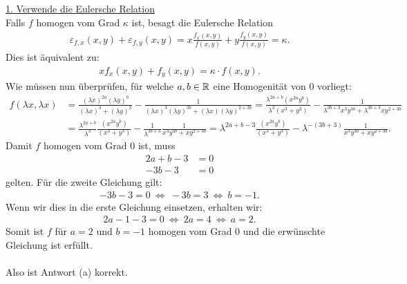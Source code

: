 \underline{1. Verwende die Eulersche Relation}\\
Falls $ f $ homogen vom Grad $ \kappa $ ist, besagt die Eulersche Relation
\begin{align*}
	\varepsilon_{f,x}(x,y) + \varepsilon_{f,y}(x,y) 
	= x \frac{f_x(x,y)}{f(x,y)} + y \frac{f_y(x,y)}{f(x,y)}
	= \kappa.
\end{align*}
Dies ist äquivalent zu:
\begin{align*}
	x f_x(x,y) + f_y(x,y) = \kappa \cdot f(x,y).
\end{align*}
Wie müssen nun überprüfen, für welche $ a, b\in \mathbb{R} $ eine Homogenität von $ 0 $ vorliegt:
\begin{align*}
	f(\lambda x, \lambda x)
	&=
	\frac{(\lambda x)^{2a} (\lambda y)^b}{(\lambda x)^3 +(\lambda y)^3}
	- 
	\frac{1}{(\lambda x)^3 (\lambda y)^{3b} + (\lambda x) (\lambda y)^{2 + 3b}}
	=
	\frac{\lambda^{2a +b} ( x^{2a}  y^b)}{\lambda^3 (x^3 + y^3 )}
	- 
	\frac{1}{\lambda^{3b + 3} x^3  y^{3b} + \lambda^{3b + 3} x  y^{2 + 3b}}\\
	&=
	\frac{\lambda^{2a +b}}{\lambda^3}\frac{ ( x^{2a}  y^b)}{ (x^3 + y^3 )}
	- 
	\frac{1}{\lambda^{3b + 3}}\frac{1}{ x^3  y^{3b} +  x  y^{2 + 3b}}
	=
		\lambda^{2a +b - 3}\frac{ ( x^{2a}  y^b)}{ (x^3 + y^3 )}
	- 
	\lambda^{-(3b + 3)}\frac{1}{ x^3  y^{3b} +  x  y^{2 + 3b}}.
\end{align*}
Damit $ f $ homogen vom Grad $ 0 $ ist, muss 
\begin{align*}
	2a + b - 3 &= 0\\
	-3b - 3 &= 0
\end{align*}
gelten. Für die zweite Gleichung gilt:
\begin{align*}
	-3b - 3 = 0 
	\ \Leftrightarrow \
	-3b = 3
	\ \Leftrightarrow \
	b = -1.
\end{align*}
Wenn wir dies in die erste Gleichung einsetzen, erhalten wir:
\begin{align*}
	2a - 1 - 3 = 0 
	\ \Leftrightarrow \
	2a = 4
	\ \Leftrightarrow \
	a = 2.
\end{align*}
Somit ist $ f $ für $ a = 2 $ und $ b= -1 $ homogen vom Grad $ 0 $ und die erwünschte Gleichung ist erfüllt.\\
\\
Also ist Antwort (a) korrekt.


